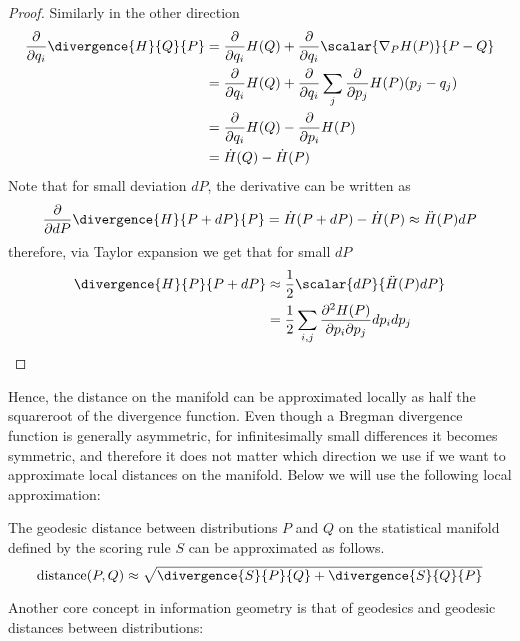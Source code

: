 \begin{statement}
\begin{proof}
		Similarly in the other direction
			\begin{align}
					\frac{\partial}{\partial q_i} \divergence{H}{Q}{P} &=  \frac{\partial}{\partial q_i} H(Q) +     \frac{\partial}{\partial q_i}\scalar{\nabla_{P} H(P)}{P - Q}\\
						&=  \frac{\partial}{\partial q_i} H(Q) + \frac{\partial}{\partial q_i}\sum_{j} \frac{\partial}{\partial p_j} H(P) (p_j - q_j)\\
						&=  \frac{\partial}{\partial q_i} H(Q)  - \frac{\partial}{\partial p_i} H(P)\\
						&= \dot{H}(Q) - \dot{H}(P)
			\end{align}
			Note that for small deviation $dP$, the derivative can be written as
			\begin{align}
				\frac{\partial}{\partial dP} \divergence{H}{P+dP}{P} = \dot{H}(P+dP) - \dot{H}(P) \approx  \ddot{H}(P) dP
			\end{align}
			therefore, via Taylor expansion we get that for small $dP$
			\begin{align}
				\divergence{H}{P}{P+dP} &\approx \frac{1}{2} \scalar{dP}{\ddot{H}(P)dP}\\
					&= \frac{1}{2} \sum_{i,j} \frac{\partial^2 H(P)}{\partial p_i\partial p_j} dp_{i} dp_j
			\end{align}
	\end{proof}
\end{statement}

Hence, the distance on the manifold can be approximated locally as half the squareroot of the divergence function. Even though a Bregman divergence function is generally asymmetric, for infinitesimally small differences it becomes symmetric, and therefore it does not matter which direction we use if we want to approximate local distances on the manifold. Below we will use the following local approximation:

\begin{corollary}
	The geodesic distance between distributions $P$ and $Q$ on the statistical manifold defined by the scoring rule $S$ can be approximated as follows.
	\begin{equation}
		\mbox{distance}(P,Q) \approx \sqrt{\divergence{S}{P}{Q} + \divergence{S}{Q}{P}} \label{eqn:local_approximation}
	\end{equation}
\end{corollary}

Another core concept in information geometry is that of geodesics and geodesic distances between distributions:

